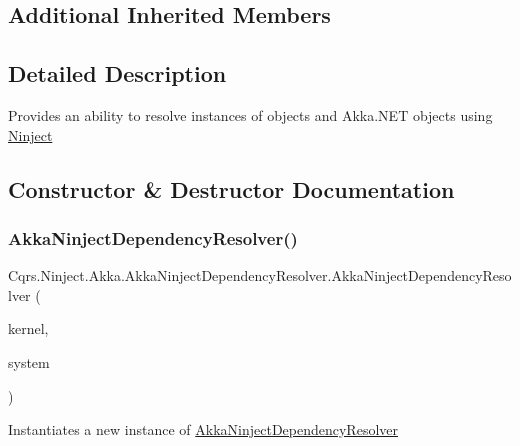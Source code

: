 \subsection*{Additional Inherited Members}


\subsection{Detailed Description}
Provides an ability to resolve instances of objects and Akka.\+N\+ET objects using \hyperlink{namespaceCqrs_1_1Ninject}{Ninject} 



\subsection{Constructor \& Destructor Documentation}
\mbox{\label{classCqrs_1_1Ninject_1_1Akka_1_1AkkaNinjectDependencyResolver_a7fdff6e54ac903d86bb79bf5536f8820_a7fdff6e54ac903d86bb79bf5536f8820}} 
\subsubsection{\texorpdfstring{Akka\+Ninject\+Dependency\+Resolver()}{AkkaNinjectDependencyResolver()}}
{\footnotesize\ttfamily Cqrs.\+Ninject.\+Akka.\+Akka\+Ninject\+Dependency\+Resolver.\+Akka\+Ninject\+Dependency\+Resolver (\begin{DoxyParamCaption}\item[{I\+Kernel}]{kernel,  }\item[{Actor\+System}]{system }\end{DoxyParamCaption})}



Instantiates a new instance of \hyperlink{classCqrs_1_1Ninject_1_1Akka_1_1AkkaNinjectDependencyResolver}{Akka\+Ninject\+Dependency\+Resolver} 




